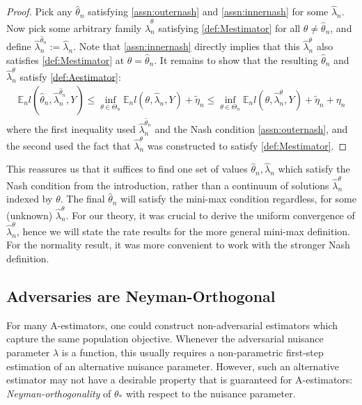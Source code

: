 \documentclass[12pt]{article}
\theoremstyle{myplain}
\theoremstyle{definition}
\theoremstyle{definition}
\theoremstyle{remark}
\numberwithin{equation}{section}
\begin{document}
\begin{proof}
Pick any $\widehat\theta_n$ satisfying \ref{assn:outernash} and \ref{assn:innernash} for some $\widehat\lambda_n$. Now pick some arbitrary family $\widehat\lambda_n^\theta$ satisfying \ref{def:Mestimator} for all $\theta\neq\widehat\theta_n$, and define $\widehat \lambda_n^{\widehat\theta_n}:=\widehat\lambda_n$. Note that \ref{assn:innernash} directly implies that this $\widehat\lambda_n^\theta$ also satisfies \ref{def:Mestimator} at $\theta=\widehat\theta_n$. It remains to show that the resulting $\widehat\theta_n$ and $\widehat\lambda_n^\theta$ satisfy \ref{def:Aestimator}:
\begin{align*}
    \mathbb{E}_n l(\widehat\theta_n, \widehat\lambda_n^{\widehat\theta_n}, Y) \leq \inf_{\theta\in\Theta_n} \mathbb{E}_n l(\theta, \widehat\lambda_n, Y) + \widetilde\eta_n \leq \inf_{\theta\in\Theta_n} \mathbb{E}_n l(\theta, \widehat\lambda_n^{\theta}, Y) + \widetilde\eta_n + \eta_n
\end{align*}
where the first inequality used $\widehat \lambda_n^{\widehat\theta_n}$ and the Nash condition \ref{assn:outernash}, and the second used the fact that $\widehat\lambda_n^\theta$ was constructed to satisfy \ref{def:Mestimator}.
\end{proof}
This reassures us that it suffices to find one set of values $\widehat\theta_n,\widehat\lambda_n$ which satisfy the Nash condition from the introduction, rather than a continuum of solutions $\widehat\lambda_n^\theta$ indexed by $\theta$. The final $\widehat\theta_n$ will satisfy the mini-max condition regardless, for some (unknown) $\widehat\lambda_n^\theta$. For our theory, it was crucial to derive the uniform convergence of $\widehat\lambda_n^\theta$, hence we will state the rate results for the more general mini-max definition. For the normality result, it was more convenient to work with the stronger Nash definition.


\subsection{Adversaries are Neyman-Orthogonal}
\label{subsec:neyman}
For many A-estimators, one could construct non-adversarial estimators which capture the same population objective. Whenever the adversarial nuisance parameter $\lambda$ is a function, this usually requires a non-parametric first-step estimation of an alternative nuisance parameter. However, such an alternative estimator may not have a desirable property that is guaranteed for A-estimators: {\it Neyman-orthogonality} of $\theta_*$ with respect to the nuisance parameter.\\ 
\end{document}
